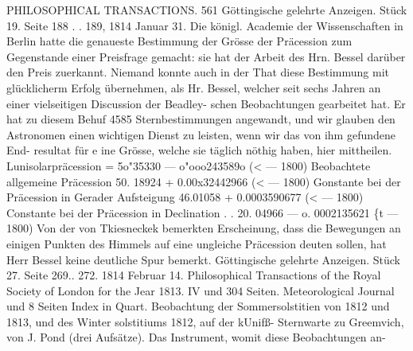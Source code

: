 \documentclass[12pt,a4paper]{article}
\begin{document}
\newpage
PHILOSOPHICAL TRANSACTIONS. 561\newline
Göttingische gelehrte Anzeigen. Stück 19. Seite 188 . . 189, 1814 Januar 31.\newline
Die königl. Academie der Wissenschaften in Berlin hatte die genaueste Bestimmung der Grösse\newline
der Präcession zum Gegenstande einer Preisfrage gemacht: sie hat der Arbeit des Hrn. Bessel darüber\newline
den Preis zuerkannt. Niemand konnte auch in der That diese Bestimmung mit glücklicherm Erfolg\newline
übernehmen, als Hr. Bessel, welcher seit sechs Jahren an einer vielseitigen Discussion der Beadley-\newline
schen Beobachtungen gearbeitet hat. Er hat zu diesem Behuf 4585 Sternbestimmungen angewandt, und\newline
wir glauben den Astronomen einen wichtigen Dienst zu leisten, wenn wir das von ihm gefundene End-\newline
resultat für e ine Grösse, welche sie täglich nöthig haben, hier mittheilen.\newline
Lunisolarpräcession = 5o"35330 --- o"ooo243589o (< --- 1800)\newline
Beobachtete allgemeine Präcession 50. 18924 + 0.00x32442966 (< --- 1800)\newline
Gonstante bei der Präcession in Gerader Aufsteigung 46.01058 + 0.0003590677 (< --- 1800)\newline
Constante bei der Präcession in Declination . . 20. 04966 --- o. 0002135621 \{t --- 1800)\newline
Von der von Tkiesneckek bemerkten Erscheinung, dass die Bewegungen an einigen Punkten des\newline
Himmels auf eine ungleiche Präcession deuten sollen, hat Herr Bessel keine deutliche Spur bemerkt.\newline
Göttingische gelehrte Anzeigen. Stück 27. Seite 269.. 272. 1814 Februar 14.\newline
Philosophical Transactions of the Royal Society of London for the Jear 1813. IV und 304 Seiten.\newline
Meteorological Journal und 8 Seiten Index in Quart.\newline
Beobachtung der Sommersolstitien von 1812 und 1813, und des Winter solstitiums 1812, auf der kUnifß-\newline
Sternwarte zu Greemvich, von J. Pond (drei Aufsätze). Das Instrument, womit diese Beobachtungen an-\newline
\end{document}

